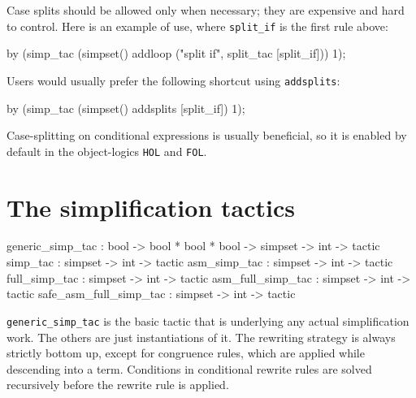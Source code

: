 Case splits should be allowed only when necessary; they are expensive
and hard to control.  Here is an example of use, where \texttt{split_if}
is the first rule above:
\begin{ttbox}
by (simp_tac (simpset() 
                 addloop ("split if", split_tac [split_if])) 1);
\end{ttbox}
Users would usually prefer the following shortcut using \texttt{addsplits}:
\begin{ttbox}
by (simp_tac (simpset() addsplits [split_if]) 1);
\end{ttbox}
Case-splitting on conditional expressions is usually beneficial, so it is
enabled by default in the object-logics \texttt{HOL} and \texttt{FOL}.


\section{The simplification tactics}\label{simp-tactics}
\begin{ttbox}
generic_simp_tac       : bool -> bool * bool * bool -> 
                         simpset -> int -> tactic
simp_tac               : simpset -> int -> tactic
asm_simp_tac           : simpset -> int -> tactic
full_simp_tac          : simpset -> int -> tactic
asm_full_simp_tac      : simpset -> int -> tactic
safe_asm_full_simp_tac : simpset -> int -> tactic
\end{ttbox}

\texttt{generic_simp_tac} is the basic tactic that is underlying any actual
simplification work. The others are just instantiations of it. The rewriting 
strategy is always strictly bottom up, except for congruence rules, 
which are applied while descending into a term.  Conditions in conditional 
rewrite rules are solved recursively before the rewrite rule is applied.


